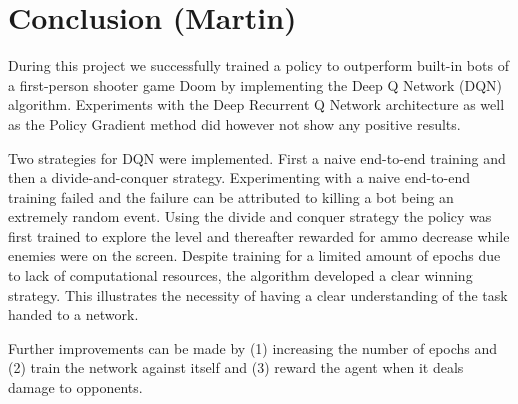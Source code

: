 \documentclass{article}
\begin{document}
\section{Conclusion (Martin)}
During this project we successfully trained a policy to outperform built-in bots of a first-person shooter game Doom by implementing the Deep Q Network (DQN) algorithm. Experiments with the Deep Recurrent Q Network architecture as well as the Policy Gradient method did however not show any positive results.

Two strategies for DQN were implemented. First a naive end-to-end training and then a divide-and-conquer strategy. Experimenting with a naive end-to-end training failed and the failure can be attributed to killing a bot being an extremely random event. Using the divide and conquer strategy the policy was first trained to explore the level and thereafter rewarded for ammo decrease while enemies were on the screen. Despite training for a limited amount of epochs due to lack of computational resources, the algorithm developed a clear winning strategy. This illustrates the necessity of having a clear understanding of the task handed to a network. 

Further improvements can be made by (1) increasing the number of epochs and (2) train the network against itself and (3) reward the agent when it deals damage to opponents.

\vfill



\end{document}

